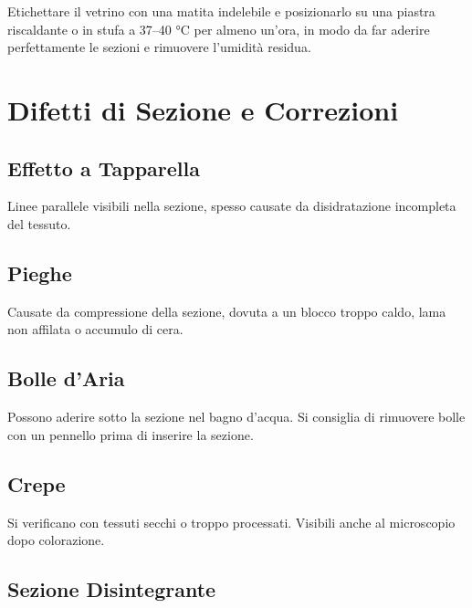 Etichettare il vetrino con una matita indelebile e posizionarlo su una piastra riscaldante o in stufa a 37–40 °C per almeno un'ora, in modo da far aderire perfettamente le sezioni e rimuovere l'umidità residua.




\section{Difetti di Sezione e Correzioni}

\subsection{Effetto a Tapparella}

Linee parallele visibili nella sezione, spesso causate da disidratazione incompleta del tessuto.

\subsection{Pieghe}

Causate da compressione della sezione, dovuta a un blocco troppo caldo, lama non affilata o accumulo di cera.

\subsection{Bolle d'Aria}

Possono aderire sotto la sezione nel bagno d'acqua. Si consiglia di rimuovere bolle con un pennello prima di inserire la sezione.

\subsection{Crepe}

Si verificano con tessuti secchi o troppo processati. Visibili anche al microscopio dopo colorazione.

\subsection{Sezione Disintegrante}

